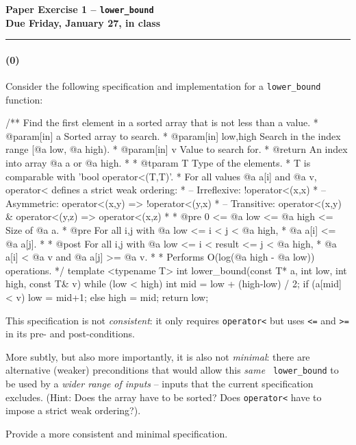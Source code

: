 \documentclass[12pt,letterpaper,twoside]{article}
\begin{document}
{\centering \textbf{Paper Exercise 1 -- {\tt lower\_bound}\\ Due Friday, January 27, in class} \par}
\vspace*{-8pt}\noindent\rule{\linewidth}{1pt}
\vspace{-3em}

\paragraph{(0)} Consider the following specification and implementation for a {\tt lower\_bound} function:
\begin{cpp}
/** Find the first element in a sorted array that is not less than a value.
 * @param[in] a         Sorted array to search.
 * @param[in] low,high  Search in the index range [@a low, @a high).
 * @param[in] v         Value to search for.
 * @return  An index into array @a a or @a high.
 *
 * @tparam T Type of the elements. 
 *   T is comparable with 'bool operator<(T,T)'.
 *   For all values @a a[i] and @a v, operator< defines a strict weak ordering:
 *    -- Irreflexive: !operator<(x,x)
 *    -- Asymmetric:   operator<(x,y) => !operator<(y,x)
 *    -- Transitive:   operator<(x,y) & operator<(y,z) => operator<(x,z)
 *
 * @pre  0 <= @a low <= @a high <= Size of @a a.
 * @pre  For all i,j with @a low <= i < j < @a high, 
 *         @a a[i] <= @a a[j].
 *
 * @post For all i,j with @a low <= i < result <= j < @a high, 
 *         @a a[i] < @a v and @a a[j] >= @a v.
 *
 * Performs O(log(@a high - @a low)) operations.
 */
template <typename T>
int lower_bound(const T* a, int low, int high, const T& v) {
   while (low < high) {
      int mid = low + (high-low) / 2;
      if (a[mid] < v)
         low = mid+1;
      else
         high = mid; 
   }
   return low;
}
\end{cpp}
This specification is not {\em consistent}: it only requires {\tt operator<} but
uses {\tt <=} and {\tt >=} in its pre- and post-conditions.

More subtly, but also more importantly, it is also not {\em minimal}: there are
alternative (weaker) preconditions that would allow this {\em same} {\tt
  lower\_bound} to be used by a {\em wider range of inputs} -- inputs that the
current specification excludes. (Hint: Does the array have to be sorted? Does
\texttt{operator<} have to impose a strict weak ordering?).

Provide a more consistent and minimal specification.

\newpage
\end{document}
